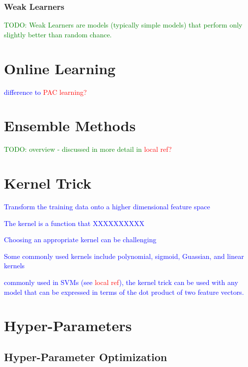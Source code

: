 \subsubsection{Weak Learners}

\textcolor{green}{TODO: Weak Learners are models (typically simple models) that perform only slightly better than random chance. }


\section{Online Learning}

\textcolor{blue}{difference to \textcolor{red}{PAC learning?}}

\section{Ensemble Methods}

\textcolor{green}{TODO: overview - discussed in more detail in \textcolor{red}{local ref?}}

\section{Kernel Trick}

\textcolor{blue}{Transform the training data onto a higher dimensional feature space}


\textcolor{blue}{The kernel is a function that XXXXXXXXXX}

\textcolor{blue}{Choosing an appropriate kernel can be challenging}

\textcolor{blue}{Some commonly used kernels include polynomial, sigmoid, Guassian, and linear kernels}

\textcolor{blue}{commonly used in SVMs (see \textcolor{red}{local ref}), the kernel trick can be used with any model that can be expressed in terms of the dot product of two feature vectors.}

\section{Hyper-Parameters}

\subsection{Hyper-Parameter Optimization}

